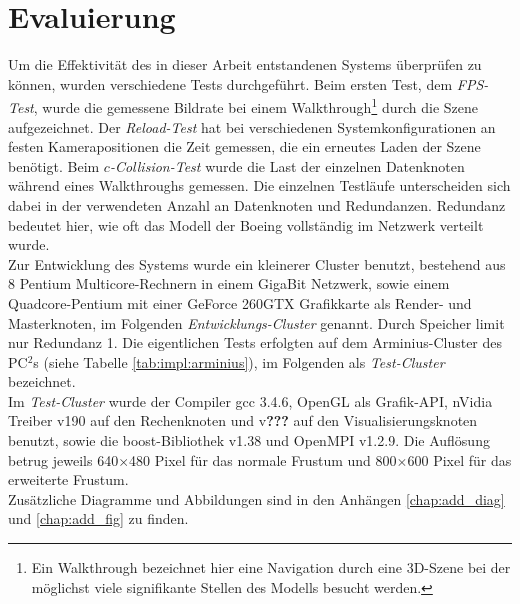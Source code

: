 \chapter{Evaluierung}
\label{chap:eval}
%
Um die Effektivität des in dieser Arbeit entstandenen Systems überprüfen zu können, wurden verschiedene Tests durchgeführt.
Beim ersten Test, dem \textit{FPS-Test}, wurde die gemessene Bildrate bei einem Walkthrough\footnote{Ein Walkthrough bezeichnet hier eine Navigation durch eine 3D-Szene bei der möglichst viele signifikante Stellen des Modells besucht werden.} durch die Szene aufgezeichnet. Der \textit{Reload-Test} hat bei verschiedenen Systemkonfigurationen an festen Kamerapositionen die Zeit gemessen, die ein erneutes Laden der Szene benötigt. Beim \textit{$c$-Collision-Test} wurde die Last der einzelnen Datenknoten während eines Walkthroughs gemessen. Die einzelnen Testläufe unterscheiden sich dabei in der verwendeten Anzahl an Datenknoten und Redundanzen. Redundanz bedeutet hier, wie oft das Modell der Boeing vollständig im Netzwerk verteilt wurde. \\
Zur Entwicklung des Systems wurde ein kleinerer Cluster benutzt, bestehend aus 8 Pentium Multicore-Rechnern in einem GigaBit Netzwerk, sowie einem Quadcore-Pentium mit einer GeForce 260GTX Grafikkarte als Render- und Masterknoten, im Folgenden \textit{Entwicklungs-Cluster} genannt. Durch  Speicher limit nur Redundanz 1. Die eigentlichen Tests erfolgten auf dem Arminius-Cluster des PC$^2$s (siehe Tabelle \ref{tab:impl:arminius}), im Folgenden als \textit{Test-Cluster} bezeichnet.\\
Im \textit{Test-Cluster} wurde der Compiler gcc 3.4.6, OpenGL als Grafik-API, nVidia Treiber v190 auf den Rechenknoten und v\textbf{???} auf den Visualisierungsknoten benutzt, sowie die boost-Bibliothek v1.38 und OpenMPI v1.2.9. Die Auflösung betrug jeweils 640$\times$480 Pixel für das normale Frustum und 800$\times$600 Pixel für das erweiterte Frustum.\\
Zusätzliche Diagramme und Abbildungen sind in den Anhängen \ref{chap:add_diag} und \ref{chap:add_fig} zu finden.


